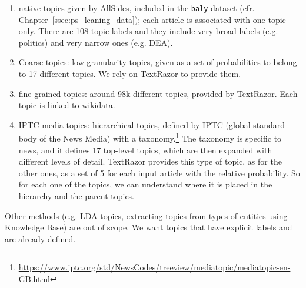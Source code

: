 \begin{enumerate}
    \item native topics given by AllSides, included in the \texttt{baly} dataset (cfr. Chapter~\ref{ssec:ps_leaning_data}); each article is associated with one topic only. There are 108 topic labels and they include very broad labels (e.g. politics) and very narrow ones (e.g. DEA).
    \item Coarse topics: low-granularity topics, given as a set of probabilities to belong to 17 different topics. We rely on TextRazor to provide them.
    \item fine-grained topics: around 98k different topics, provided by TextRazor. Each topic is linked to wikidata.
    \item IPTC media topics: hierarchical topics, defined by IPTC (global standard body of the News Media) with a taxonomy.\footnote{\url{https://www.iptc.org/std/NewsCodes/treeview/mediatopic/mediatopic-en-GB.html}}
    The taxonomy is specific to news, and it defines 17 top-level topics, which are then expanded with different levels of detail. TextRazor provides this type of topic, as for the other ones, as a set of 5 for each input article with the relative probability. So for each one of the topics, we can understand where it is placed in the hierarchy and the parent topics.
\end{enumerate}



Other methods (e.g. LDA topics, extracting topics from types of entities using Knowledge Base) are out of scope. We want topics that have explicit labels and are already defined.

